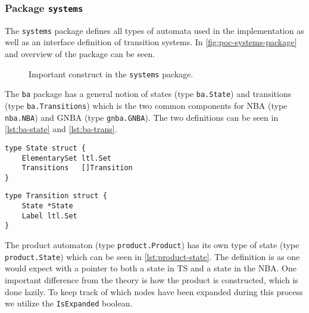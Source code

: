 \subsubsection{Package \texttt{systems}}
The \verb=systems= package defines all types of automata used in the implementation as well as an interface definition of transition systems. In \autoref{fig:poc-systems-package} and overview of the package can be seen.
\begin{figure}
    \caption{Important construct in the \texttt{systems} package.}
    \label{fig:poc-systems-package}
\end{figure}
The \verb=ba= package has a general notion of states (type \verb=ba.State=) and transitions (type \verb=ba.Transitions=) which is the two common components for NBA (type \verb=nba.NBA=) and GNBA (type \verb=gnba.GNBA=). The two definitions can be seen in \autoref{lst:ba-state} and \autoref{lst:ba-trans}.


\begin{lstlisting}[language=Golang, caption={Definition of \texttt{ba.State}.}, label={lst:ba-state}, floatplacement=H]
type State struct {
    ElementarySet ltl.Set
    Transitions   []Transition
}
\end{lstlisting}

\begin{lstlisting}[language=Golang, caption={Definition of \texttt{ba.Transition}.}, label={lst:ba-trans}, floatplacement=H]
type Transition struct {
    State *State
    Label ltl.Set
}
\end{lstlisting}

The product automaton (type \verb=product.Product=) has its own type of state (type \verb=product.State=) which can be seen in \autoref{lst:product-state}. The definition is as one would expect with a pointer to both a state in TS and a state in the NBA. One important difference from the theory is how the product is constructed, which is done lazily. To keep track of which nodes have been expanded during this process we utilize the \verb=IsExpanded= boolean. 

